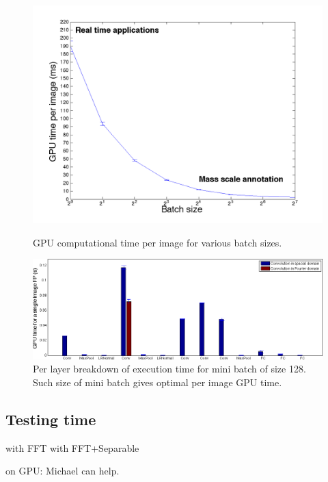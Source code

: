 \documentclass{article}
\begin{document}
\begin{figure}[h]
  \begin{minipage}[b]{0.48\linewidth}
  	\includegraphics[width=\textwidth]{img/eval_per_batch_GPU.png}
  	\caption{GPU computational time per image for various batch sizes.}
  \end{minipage}
  \hspace{2mm}
  \begin{minipage}[b]{0.48\linewidth}
  	\includegraphics[width=\textwidth]{img/eval_per_layer_per_batch_GPU_128_batch_size.png}
  	\caption{Per layer breakdown of execution time for mini batch of size 128. Such size of mini batch gives optimal per image GPU time.}
  \end{minipage}
\end{figure}

\subsection{Testing time}

with FFT
with FFT+Separable

on GPU: Michael can help.
\end{document}
